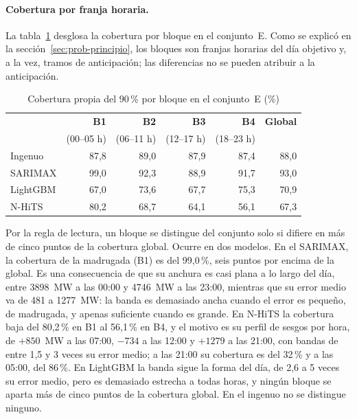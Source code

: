 \paragraph{Cobertura por franja horaria.} La tabla~\ref{tab:cal-bloques} desglosa
la cobertura por bloque en el conjunto~E. Como se explicó en la
sección~\ref{sec:prob-principio}, los bloques son franjas horarias del día
objetivo y, a la vez, tramos de anticipación; las diferencias no se pueden
atribuir a la anticipación.

\begin{table}[htbp]
	\centering
	\caption{Cobertura propia del 90\,\% por bloque en el conjunto~E (\%)}
	\label{tab:cal-bloques}
	\small
	\begin{tabular}{lrrrrr}
		\hline
		 & \textbf{B1} & \textbf{B2} & \textbf{B3} & \textbf{B4} & \textbf{Global} \\
		 & (00--05 h) & (06--11 h) & (12--17 h) & (18--23 h) & \\
		\hline
		Ingenuo & 87,8 & 89,0 & 87,9 & 87,4 & 88,0 \\
		SARIMAX & 99,0 & 92,3 & 88,9 & 91,7 & 93,0 \\
		LightGBM & 67,0 & 73,6 & 67,7 & 75,3 & 70,9 \\
		N-HiTS & 80,2 & 68,7 & 64,1 & 56,1 & 67,3 \\
		\hline
	\end{tabular}
\end{table}

Por la regla de lectura, un bloque se distingue del conjunto solo si difiere en
más de cinco puntos de la cobertura global. Ocurre en dos modelos. En el SARIMAX,
la cobertura de la madrugada (B1) es del 99,0\,\%, seis puntos por encima de la
global. Es una consecuencia de que su anchura es casi plana a lo largo del
día, entre 3898~MW a las 00:00 y 4746~MW a las 23:00, mientras que su error
medio va de 481 a 1277~MW: la banda es demasiado ancha cuando el error es
pequeño, de madrugada, y apenas suficiente cuando es grande. En N-HiTS la
cobertura baja del 80,2\,\% en B1 al 56,1\,\% en B4, y el motivo es su perfil
de sesgos por hora, de $+850$~MW a las 07:00, $-734$ a las 12:00 y $+1279$ a
las 21:00, con bandas de entre 1,5 y 3 veces su error medio; a las 21:00 su
cobertura es del 32\,\% y a las 05:00, del 86\,\%. En LightGBM la banda sigue la
forma del día, de 2,6 a 5 veces su error medio, pero es demasiado estrecha a
todas horas, y ningún bloque se aparta más de cinco puntos de la cobertura
global. En el ingenuo no se distingue ninguno.

